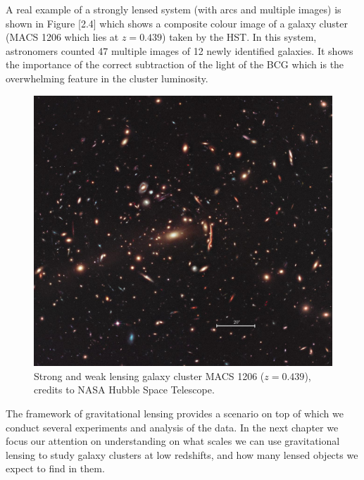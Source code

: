 A real example of a strongly lensed system (with arcs and multiple images) is shown in Figure [2.4] which shows a composite colour image of a galaxy cluster (MACS 1206 which lies at $z=0.439$) taken by the HST. In this system, astronomers counted 47 multiple images of 12 newly identified galaxies. It shows the importance of the correct subtraction of the light of the BCG which is the overwhelming feature in the cluster luminosity. 

\begin{figure}[H]
\centering
\includegraphics[width=12cm]{images/GC.jpg}
\caption[Galaxy Cluster MACS 1206]{Strong and weak lensing galaxy cluster MACS 1206 ($z=0.439$), credits to NASA Hubble Space Telescope.}
\end{figure}

The framework of gravitational lensing provides a scenario on top of which we conduct several experiments and analysis of the data. In the next chapter we focus our attention on understanding on what scales we can use gravitational lensing to study galaxy clusters at low redshifts, and how many lensed objects we expect to find in them.